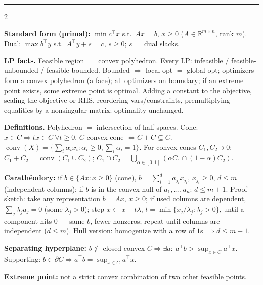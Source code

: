 \documentclass{article}
\newcommand{\sect}[1]{\par\vspace{1.2pt}{\fontsize{8}{9.2}\selectfont\textbf{#1}}\par\vspace{0.2pt}}
\newcommand{\kw}[1]{\textbf{#1}}
\begin{document}
\par
\vspace{1pt}\hrule\vspace{2pt}
\fontsize{6.7}{8.05}\selectfont
\begin{multicols}{2}

\sect{1. LP Foundations \& Convexity}
\kw{Standard form (primal):} $\min c^\top x$ s.t.\ $Ax=b$, $x\ge 0$ ($A\in\mathbb{R}^{m\times n}$, rank $m$). Dual: $\max b^\top y$ s.t.\ $A^\top y+s=c$, $s\ge 0$; $s=$ dual slacks.

\kw{LP facts.} Feasible region $=$ convex polyhedron. Every LP: infeasible / feasible-unbounded / feasible-bounded. Bounded $\Rightarrow$ local opt $=$ global opt; optimizers form a convex polyhedron (a face); all optimizers on boundary; if an extreme point exists, some extreme point is optimal. Adding a constant to the objective, scaling the objective or RHS, reordering vars/constraints, premultiplying equalities by a nonsingular matrix: optimality unchanged.

\kw{Definitions.} Polyhedron $=$ intersection of half-spaces. Cone: $x\in C\Rightarrow tx\in C\ \forall t\ge 0$. $C$ convex cone $\Leftrightarrow C+C\subseteq C$. $\operatorname{conv}(X)=\{\sum_i\alpha_i x_i:\alpha_i\ge 0,\sum_i\alpha_i=1\}$. For convex cones $C_1,C_2\ni 0$: $C_1+C_2=\operatorname{conv}(C_1\cup C_2)$; $C_1\cap C_2=\bigcup_{\alpha\in[0,1]}(\alpha C_1\cap(1-\alpha)C_2)$.

\kw{Carath\'eodory:} if $b\in\{Ax:x\ge 0\}$ (cone), $b=\sum_{i=1}^{d}a_{j_i}x_{j_i}$, $x_{j_i}\ge 0$, $d\le m$ (independent columns); if $b$ is in the convex hull of $a_1,\ldots,a_n$: $d\le m+1$. Proof sketch: take any representation $b=Ax$, $x\ge 0$; if used columns are dependent, $\sum_j\lambda_j a_j=0$ (some $\lambda_j>0$); step $x\leftarrow x-t\lambda$, $t=\min\{x_j/\lambda_j:\lambda_j>0\}$, until a component hits $0$ --- same $b$, fewer nonzeros; repeat until columns are independent ($d\le m$). Hull version: homogenize with a row of $1$s $\Rightarrow d\le m+1$.

\kw{Separating hyperplane:} $b\notin$ closed convex $C\Rightarrow\exists a:\ a^\top b>\sup_{x\in C}a^\top x$. Supporting: $b\in\partial C\Rightarrow a^\top b=\sup_{x\in C}a^\top x$.

\kw{Extreme point:} not a strict convex combination of two other feasible points.


\end{multicols}
\end{document}
